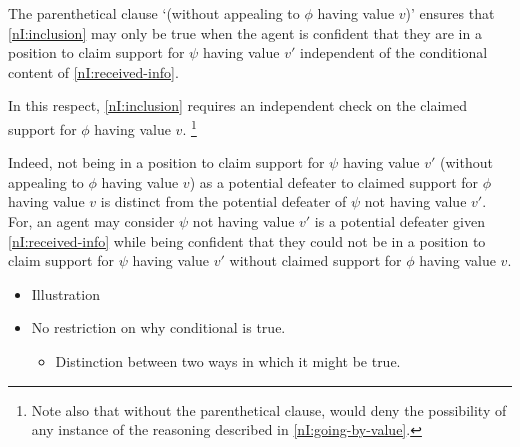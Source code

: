 \begin{note}
  The parenthetical clause `(without appealing to \(\phi\) having value \(v\))' ensures that \ref{nI:inclusion} may only be true when the agent is confident that they are in a position to claim support for \(\psi\) having value \(v'\) independent of the conditional content of \ref{nI:received-info}.

  In this respect, \ref{nI:inclusion} requires an independent check on the claimed support for \(\phi\) having value \(v\).\nolinebreak
  \footnote{
    Note also that without the parenthetical clause, \nI{} would deny the possibility of any instance of the reasoning described in \ref{nI:going-by-value}.
  }

  Indeed, not being in a position to claim support for \(\psi\) having value \(v'\) (without appealing to \(\phi\) having value \(v\)) as a potential defeater to claimed support for \(\phi\) having value \(v\) is distinct from the potential defeater of \(\psi\) not having value \(v'\).
  For, an agent may consider \(\psi\) not having value \(v'\) is a potential defeater given \ref{nI:received-info} while being confident that they could not be in a position to claim support for \(\psi\) having value \(v'\) without claimed support for \(\phi\) having value \(v\).

  \begin{itemize}
  \item Illustration
  \item No restriction on why conditional is true.
    \begin{itemize}
    \item Distinction between two ways in which it might be true.
    \end{itemize}
  \end{itemize}
\end{note}


